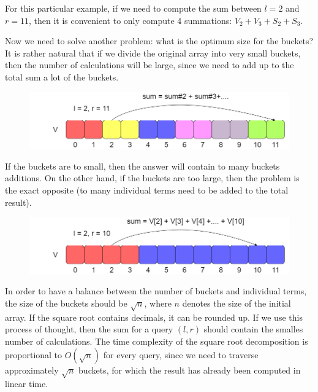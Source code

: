\documentclass[letterpaper]{article}
\begin{document}
For this particular example, if we need to compute the sum between $l = 2$ and $r = 11$, then it is convenient to only compute 4 summations: $V_2 + V_3 + S_2 + S_3$.

Now we need to solve another problem: what is the optimum size for the buckets? It is rather natural that if we divide the original array into very small buckets, then the number of calculations will be large, since we need to add up to the total sum a lot of the buckets.

\newpage

\begin{figure} [h!]
\centering
\includegraphics[width=1\textwidth]{pngOfDiagrams/sqrtdecomposition3.png}
\end{figure}

If the buckets are to small, then the answer will contain to many buckets additions. On the other hand, if the buckets are too large, then the problem is the exact opposite (to many individual terms need to be added to the total result).

\begin{figure} [h!]
\centering
\includegraphics[width=1\textwidth]{pngOfDiagrams/sqrtdecomposition4.png}
\end{figure}

In order to have a balance between the number of buckets and individual terms, the size of the buckets should be $\sqrt{n}$, where $n$ denotes the size of the initial array. If the square root contains decimals, it can be rounded up. If we use this process of thought, then the sum for a query $(l,r)$ should contain the smalles number of calculations. The time complexity of the square root decomposition is proportional to $O(\sqrt{n})$ for every query, since we need to traverse approximately $\sqrt{n}$ buckets, for which the result has already been computed in linear time.
\end{document}
